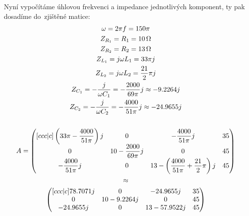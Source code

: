 Nyní vypočítáme úhlovou frekvenci a impedance jednotlivých komponent, ty pak dosadíme do~zjištěné matice:
\begin{gather*}
    \omega = 2 \pi f = 150 \pi \\
    Z_{R_1} = R_1 = \SI{10}{\ohm} \\
    Z_{R_2} = R_2 = \SI{13}{\ohm} \\
    Z_{L_1} = j \omega L_1 = 33\pi j \\
    Z_{L_2} = j \omega L_2 = \frac{21}{2}\pi j \\
    Z_{C_1} = -\frac{j}{\omega C_1} = -\frac{2000}{69\pi} j \approx \num{-9.2264}j \\
    Z_{C_2} = -\frac{j}{\omega C_2} = -\frac{4000}{51\pi} j \approx \num{-24.9655}j \\
    \\
    \everymath{\displaystyle}
    A = \begin{pmatrix}[ccc|c]
    \left(33\pi-\frac{4000}{51\pi}\right) j & 0 & -\frac{4000}{51\pi} j & 35 \\
    0 & 10 -\frac{2000}{69\pi} j &                           0 & 45 \\
    -\frac{4000}{51\pi} j & 0 & 13 - \left(\frac{4000}{51\pi} + \frac{21}{2}\pi\right) j & 45
    \end{pmatrix} \\
    \approx \\
    \begin{pmatrix}[ccc|c]
    \num{78.7071}j & 0 & \num{-24.9655}j & 35 \\
    0 & 10 - \num{9.2264}j & 0 & 45 \\
    \num{-24.9655}j & 0 & 13-\num{57.9522}j & 45
    \end{pmatrix}
\end{gather*}

